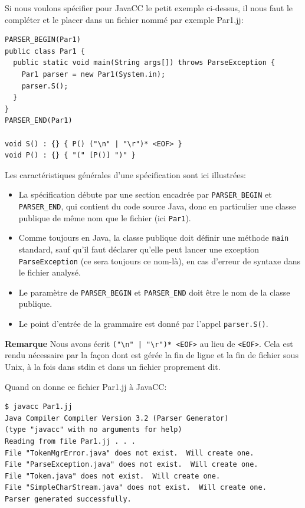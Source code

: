 \documentclass[11pt,a4paper]{article}
\newcommand{\Java}{\textsf{Java}\xspace}
\newcommand{\JavaCC}{\textsf{JavaCC}\xspace}
\newcommand{\bitem}{\item[$\bullet$]}
\begin{document}
\noindent
Si nous voulons spécifier pour \JavaCC le petit exemple ci-dessus, il
nous faut le compléter et le placer dans un fichier nommé par exemple
\textsf{Par1.jj}:

{\small
\begin{verbatim}
PARSER_BEGIN(Par1)
public class Par1 {
  public static void main(String args[]) throws ParseException {
    Par1 parser = new Par1(System.in);
    parser.S();
  }
}
PARSER_END(Par1)

void S() : {} { P() ("\n" | "\r")* <EOF> }
void P() : {} { "(" [P()] ")" }
\end{verbatim}
}

\noindent Les caractéristiques générales d'une spécification sont ici
illustrées:

\begin{itemize}

  \bitem La spécification débute par une section encadrée par
  \texttt{PARSER\_BEGIN} et \texttt{PARSER\_END}, qui contient du code
  source \Java, donc en particulier une classe publique de même nom
  que le fichier (ici \texttt{Par1}).

  \bitem Comme toujours en \Java, la classe publique doit définir une
  méthode \texttt{main} standard, sauf qu'il faut déclarer qu'elle
  peut lancer une exception \texttt{ParseException} (ce sera toujours
  ce nom-là), en cas d'erreur de syntaxe dans le fichier analysé.

  \bitem Le paramètre de \texttt{PARSER\_BEGIN} et
  \texttt{PARSER\_END} doit être le nom de la classe publique.

  \bitem Le point d'entrée de la grammaire est donné par l'appel
  \texttt{parser.S()}.

\end{itemize}

\noindent \textbf{Remarque} Nous avons écrit
\verb+("\n" | "\r")* <EOF>+ au lieu de \verb+<EOF>+. Cela est rendu
nécessaire par la façon dont est gérée la fin de ligne et la fin de
fichier sous Unix, à la fois dans \textsf{stdin} et dans un fichier
proprement dit.

\noindent Quand on donne ce fichier \textsf{Par1.jj} à \JavaCC:

{\small
\begin{verbatim}
$ javacc Par1.jj
Java Compiler Compiler Version 3.2 (Parser Generator)
(type "javacc" with no arguments for help)
Reading from file Par1.jj . . .
File "TokenMgrError.java" does not exist.  Will create one.
File "ParseException.java" does not exist.  Will create one.
File "Token.java" does not exist.  Will create one.
File "SimpleCharStream.java" does not exist.  Will create one.
Parser generated successfully.
\end{verbatim}
}
\end{document}
